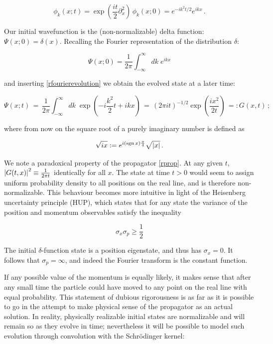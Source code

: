 \documentclass{article}
\begin{document}
\begin{equation}
    \label{rfourierevolution}
    \phi_k(x; t) = \exp(\frac{it}{2}\partial_x^2) \, \phi_k(x;0) = e^{-ik^{2}t/2} e^{ikx}\,.
\end{equation}

Our initial wavefunction is the (non-normalizable) delta function: $\Psi(x;0) = \delta(x)$. Recalling the Fourier representation of the distribution $\delta$:

\begin{equation*}
    \Psi(x;0) = \frac{1}{2\pi} \int_{-\infty}^\infty dk \; e^{ikx} 
\end{equation*}

and inserting \eqref{rfourierevolution} we obtain the evolved state at a later time:

\begin{equation}\label{rprop}
    \Psi(x;t)\, =\, \frac{1}{2\pi} \int_{-\infty}^{\infty} dk \; \exp( - i \frac{k^2}{2}t +  ikx )\, =\, (2 \pi i t)^{-1/2} \exp(\frac{ix^2}{2t})\, =: G(x,t)\,;
\end{equation}

where from now on the square root of a purely imaginary number is defined as

\begin{equation*}
    \sqrt{ix} := e^{i(\operatorname{sgn} x) \frac{\pi}{4}} \sqrt{\abs{x}}\,.
\end{equation*}

We note a paradoxical property of the propagator \eqref{rprop}. At any given $t$, $\abs{G(t,x)}^2 \equiv \frac{1}{2\pi t}$ identically for all $x$. The state at time $t>0$ would seem to assign uniform probability density to all positions on the real line, and is therefore non-normalizable. This behaviour becomes more intuitive in light of the Heisenberg uncertainty principle (HUP), which states that for any state the variance of the position and momentum observables satisfy the inequality

\begin{equation*}
    \sigma_x \sigma_p \geq \frac{1}{2}
\end{equation*}

The initial $\delta$-function state is a position eigenstate, and thus has $\sigma_x = 0$. It follows that $\sigma_p = \infty$, and indeed the Fourier transform is the constant function.

If any possible value of the momentum is equally likely, it makes sense that after any small time the particle could have moved to any point on the real line with equal probability. This statement of dubious rigorousness is as far as it is possible to go in the attempt to make physical sense of the propagator as an actual solution. In reality, physically realizable initial states are normalizable and will remain so as they evolve in time; nevertheless it will be possible to model such evolution through convolution with the Schr\"odinger kernel:
\end{document}
